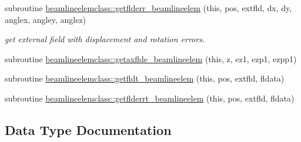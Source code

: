 \begin{DoxyCompactItemize}
\item 
subroutine \mbox{\hyperlink{namespacebeamlineelemclass_aa711cecfd3c01152cb0d88d88b645c4b}{beamlineelemclass\+::getflderr\+\_\+beamlineelem}} (this, pos, extfld, dx, dy, anglex, angley, anglez)
\begin{DoxyCompactList}\small\item\em get external field with displacement and rotation errors. \end{DoxyCompactList}\item 
subroutine \mbox{\hyperlink{namespacebeamlineelemclass_aa38d23f41bd5b34e31e784e1bb1b4ba2}{beamlineelemclass\+::getaxflde\+\_\+beamlineelem}} (this, z, ez1, ezp1, ezpp1)
\item 
subroutine \mbox{\hyperlink{namespacebeamlineelemclass_a99175508a57a532d040552a0a72bdcc1}{beamlineelemclass\+::getfldt\+\_\+beamlineelem}} (this, pos, extfld, fldata)
\item 
subroutine \mbox{\hyperlink{namespacebeamlineelemclass_a7684dcfae71c895630dae0e95476e203}{beamlineelemclass\+::getflderrt\+\_\+beamlineelem}} (this, pos, extfld, fldata)
\end{DoxyCompactItemize}


\subsection{Data Type Documentation}
\label{structbeamlineelemclass_1_1beamlineelem}
